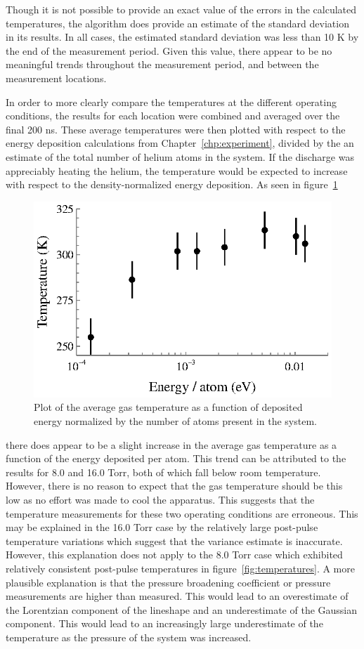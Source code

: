 Though it is not possible to provide an exact value of the errors in the
calculated temperatures, the algorithm does provide an estimate of the standard
deviation in its results. In all cases, the estimated standard deviation was less
than 10 K by the end of the measurement period. Given this value, there appear
to be no meaningful trends throughout the measurement period, and between the
measurement locations.

In order to more clearly compare the temperatures at the different operating
conditions, the results for each location were combined and averaged over the
final 200 ns. These average temperatures were then plotted with respect to the
energy deposition calculations from Chapter~\ref{chp:experiment}, divided by the
an estimate of the total number of helium atoms in the system. If the discharge
was appreciably heating the helium, the temperature would be expected to
increase with respect to the density-normalized energy deposition. As seen in
figure~\ref{fig:tvp}
\begin{figure}
  \centering
  \includegraphics{./chapters/metastables/figures/tvp.eps}
  \caption{Plot of the average gas temperature as a function of deposited
  energy normalized by the number of atoms present in the system.}
  \label{fig:tvp}
\end{figure}
there does appear to be a slight increase in the average gas temperature as a
function of the energy deposited per atom. This trend can be attributed to the
results for 8.0 and 16.0 Torr, both of which fall below room temperature.
However, there is no reason to expect that the gas temperature should be this
low as no effort was made to cool the apparatus. This suggests that the
temperature measurements for these two operating conditions are erroneous. This
may be explained in the 16.0 Torr case by the relatively large post-pulse
temperature variations which suggest that the variance estimate is inaccurate.
However, this explanation does not apply to the 8.0 Torr case which exhibited
relatively consistent post-pulse temperatures in figure~\ref{fig:temperatures}.
A more plausible explanation is that the pressure broadening coefficient or
pressure measurements are higher than measured. This would lead to an
overestimate of the Lorentzian component of the lineshape and an underestimate
of the Gaussian component. This would lead to an increasingly large
underestimate of the temperature as the pressure of the system was increased.

